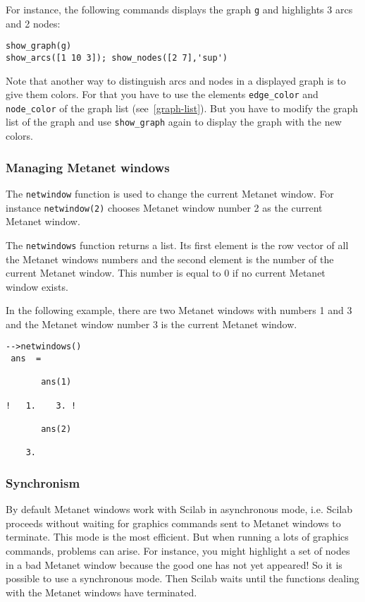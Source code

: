 \documentclass[11pt]{article}
\newcommand{\func}[1]{\texttt{#1}}
\begin{document}
For instance, the following commands displays the graph \texttt{g} and
highlights 3 arcs and 2 nodes:
\begin{verbatim}
show_graph(g)
show_arcs([1 10 3]); show_nodes([2 7],'sup')
\end{verbatim}

Note that another way to distinguish arcs and nodes in a displayed
graph is to give them colors. For that you have to use the elements 
\texttt{edge\_color} and \texttt{node\_color} of the graph list
(see~\ref{graph-list}). But you have to modify the graph list of the
graph and use \func{show\_graph} again to display the graph with
the new colors.

\subsubsection{Managing Metanet windows}\label{manage}

The \func{netwindow} function is used to change the current Metanet
window. For instance \texttt{netwindow(2)} chooses Metanet window
number 2 as the current Metanet window.

The \func{netwindows} function returns a list. Its first element is
the row vector of 
all the Metanet windows numbers and the second element is the number of the 
current Metanet window. This number is equal to 0 if no current Metanet
window exists.

In the following example, there are two Metanet windows with numbers 1
and 3 and the  Metanet window number 3 is the current Metanet window.
\begin{verbatim}
-->netwindows()
 ans  =
 
       ans(1)
 
!   1.    3. !
 
       ans(2)
 
    3.  
\end{verbatim}

\subsubsection{Synchronism}\label{synchro}

By default Metanet windows work with Scilab in asynchronous mode, 
\mbox{i.e.} Scilab
proceeds without waiting for graphics commands sent to Metanet windows to
terminate. This mode is the most efficient. But when running a lots of
graphics commands, problems can arise. For instance, you might
highlight a set of nodes in a bad Metanet window because the good one
has not yet appeared! So it is possible to use a synchronous
mode. Then Scilab waits until the functions dealing with the Metanet
windows have terminated. 
\end{document}
